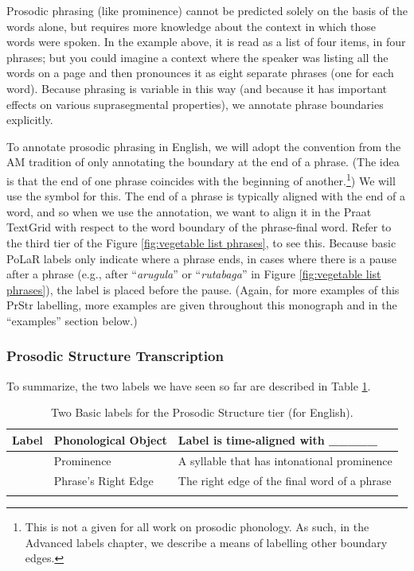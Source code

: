 \documentclass[11pt, twoside]{memoir}
\def\textlabel#1{{\relsize{-.5}\fontspec[Mapping=tex-text]{Roboto Mono}{#1}}}
\def\langtext#1{\textit{#1}}
\begin{document}
Prosodic phrasing (like prominence) cannot be predicted solely on the basis of the words alone, but requires more knowledge about the context in which those words were spoken. In the example above, it is read as a list of four items, in four phrases; but you could imagine a context where the speaker was listing all the words on a page and then pronounces it as eight separate phrases (one for each word). Because phrasing is variable in this way (and because it has important effects on various suprasegmental properties), we annotate phrase boundaries explicitly.

To annotate prosodic phrasing in English, we will adopt the convention from the AM tradition of only annotating the boundary at the end of a phrase. (The idea is that the end of one phrase coincides with the beginning of another.\footnote{This is not a given for all work on prosodic phonology. As such, in the Advanced labels chapter, we describe a means of labelling other boundary edges.}) We will use the \textlabel{]} symbol for this. The end of a phrase is typically aligned with the end of a word, and so when we use the \textlabel{]} annotation, we want to align it in the Praat TextGrid with respect to the word boundary of the phrase-final word. Refer to the third tier of the Figure \ref{fig:vegetable list phrases}, to see this. Because basic PoLaR labels only indicate where a phrase ends, in cases where there is a pause after a phrase (e.g., after “\langtext{arugula}” or “\langtext{rutabaga}” in Figure \ref{fig:vegetable list phrases}), the \textlabel{]} label is placed before the pause. (Again, for more examples of this PrStr labelling, more examples are given throughout this monograph and in the “examples” section below.)

\subsubsection{Prosodic Structure Transcription}
To summarize, the two labels we have seen so far are described in Table \ref{2 PrStr basic labels}.

\begin{longtable}{cll} \toprule \textbf{Label} & \textbf{Phonological Object} & \textbf{Label is time-aligned with \_\_\_\_\_}\tabularnewline
\midrule \endhead
\textlabel{*} & Prominence & A syllable that has intonational prominence \tabularnewline
\textlabel{]} & Phrase’s Right Edge & The right edge of the final word of a phrase \tabularnewline
\bottomrule 
\caption{Two Basic labels for the Prosodic Structure tier (for English).%
\label{2 PrStr basic labels}%
}
\end{longtable}
\end{document}
